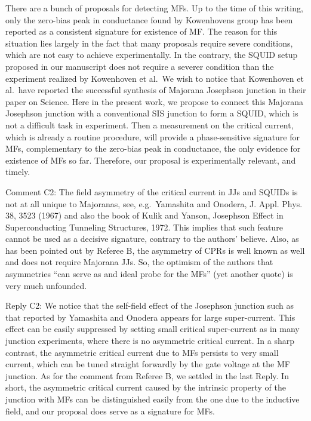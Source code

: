 \documentclass[11pt]{article}
\begin{document}
There are a bunch of proposals for detecting MFs. Up to the time of this
writing, only the zero-bias peak in conductance found by Kowenhovens
group has been reported as a consistent signature for existence of MF.
The reason for this situation lies largely in the fact that many
proposals require severe conditions, which are not easy to achieve
experimentally. In the contrary, the SQUID setup proposed in our
manuscript does not require a severer condition than the experiment
realized by Kowenhoven et al.~We wish to notice that Kowenhoven et
al.~have reported the successful synthesis of Majorana Josephson
junction in their paper on Science. Here in the present work, we propose
to connect this Majorana Josephson junction with a conventional SIS
junction to form a SQUID, which is not a difficult task in experiment.
Then a measurement on the critical current, which is already a routine
procedure, will provide a phase-sensitive signature for MFs,
complementary to the zero-bias peak in conductance, the only evidence
for existence of MFs so far. Therefore, our proposal is experimentally
relevant, and timely.

Comment C2: The field asymmetry of the critical current in JJs and
SQUIDs is not at all unique to Majoranas, see, e.g.~Yamashita and
Onodera, J. Appl. Phys. 38, 3523 (1967) and also the book of Kulik and
Yanson, Josephson Effect in Superconducting Tunneling Structures, 1972.
This implies that such feature cannot be used as a decisive signature,
contrary to the authors' believe. Also, as has been pointed out by
Referee B, the asymmetry of CPRs is well known as well and does not
require Majorana JJs. So, the optimism of the authors that asymmetries
``can serve as and ideal probe for the MFs'' (yet another quote) is very
much unfounded.

Reply C2: We notice that the self-field effect of the Josephson junction
such as that reported by Yamashita and Onodera appears for large
super-current. This effect can be easily suppressed by setting small
critical super-current as in many junction experiments, where there is
no asymmetric critical current. In a sharp contrast, the asymmetric
critical current due to MFs persists to very small current, which can be
tuned straight forwardly by the gate voltage at the MF junction. As for
the comment from Referee B, we settled in the last Reply. In short, the
asymmetric critical current caused by the intrinsic property of the
junction with MFs can be distinguished easily from the one due to the
inductive field, and our proposal does serve as a signature for MFs.
\end{document}
